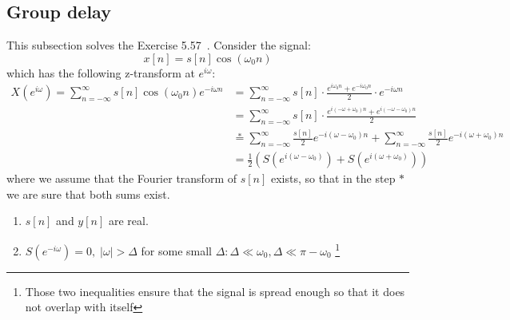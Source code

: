 \renewcommand{\arg}{\sphericalangle}
\newcommand{\grd}{\operatorname{grd}} %

\subsection{Group delay}
This subsection solves the Exercise 5.57~\cite{oppenheim2010discrete}. Consider the signal:
\[x[n] = s[n] \cos(\omega_0 n)\]
which has the following z-transform at $e^{i\omega}$:
\begin{equation}
    \begin{aligned}
        X(e^{i\omega})
        = \sum_{n = -\infty}^{\infty} s[n] \cos(\omega_0 n) e^{-i\omega n}
         & = \sum_{n = -\infty}^{\infty} s[n] \cdot \frac{e^{i\omega_0 n} + e^{-i\omega_0 n}}{2} \cdot e^{-i\omega n}
        \\ &= \sum_{n = -\infty}^{\infty} s[n] \cdot \frac{e^{i(-\omega + \omega_0) n} + e^{i(-\omega - \omega_0) n}}{2}
        \\ &\overset{*}{=} \sum_{n = -\infty}^{\infty} \frac{s[n]}{2} e^{-i(\omega - \omega_0) n} + \sum_{n = -\infty}^{\infty} \frac{s[n]}{2} e^{-i(\omega + \omega_0) n}
        \\ &= \frac{1}{2} (S(e^{i(\omega - \omega_0)}) + S(e^{i(\omega + \omega_0)}))
    \end{aligned}
    \label{eq:harmonic signal expansion}
\end{equation}
where we assume that the Fourier transform of $s[n]$ exists, so that in the step $*$ we are sure that both sums exist.

\begin{enumerate}[label = Assumption \arabic{enumi}, align = left]
    \item \label{eq:real signal assumption} $s[n]$ and $y[n]$ are real.
    \item \label{eq:concentration assumption} $S(e^{-i\omega}) = 0, \; |\omega| > \Delta$ for some small $\Delta:\Delta \ll \omega_0, \Delta \ll \pi - \omega_0$ \footnote{Those two inequalities ensure that the signal is spread enough so that it does not overlap with itself}
\end{enumerate}


